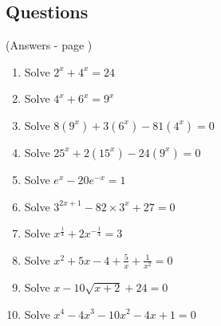 \documentclass[../main.tex]{subfiles}
\begin{document}
\subsection*{Questions}
(Answers - page \pageref*{Quadratics answers})
\label{quadratics}
\begin{enumerate}
    \item Solve \(2^x+4^x=24\)
    
    \item Solve \(4^x+6^x=9^x\)
    
    \item Solve \(8(9^x)+3(6^x)-81(4^x)=0\)
    
    \item Solve \(25^x+2(15^x)-24(9^x)=0\)
    
    \item Solve \(e^x - 20e^{-x} = 1\)
    
    \item Solve \(3^{2x+1} - 82\times 3^{x} +27 = 0\)
    
    \item Solve \(x^{\frac{1}{4}} +2x^{-\frac{1}{4}}=3\)
    
    \item Solve \(x^2 + 5x - 4 + \frac{5}{x} + \frac{1}{x^2} = 0\)
    
    \item Solve \(x - 10\sqrt{x+2} + 24 = 0\)
    
    \item Solve \(x^4 -4x^3 - 10x^2 -4x +1 = 0\)

\end{enumerate}
\end{document}
